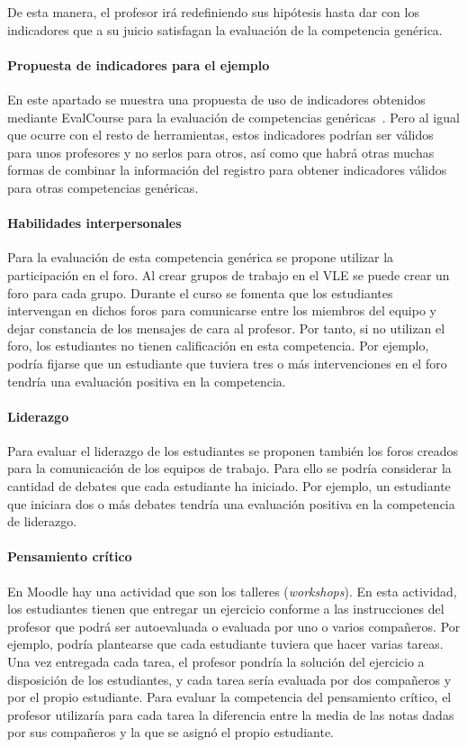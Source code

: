 			De esta manera, el profesor irá redefiniendo sus hipótesis hasta dar con los indicadores que a su juicio satisfagan la evaluación de la competencia genérica.

			\paragraph*{Propuesta de indicadores para el ejemplo}

			En este apartado se muestra una propuesta de uso de indicadores obtenidos mediante EvalCourse para la evaluación de competencias genéricas~\cite{Balderas:2015}. Pero al igual que ocurre con el resto de herramientas, estos indicadores podrían ser válidos para unos profesores y no serlos para otros, así como que habrá otras muchas formas de combinar la información del registro para obtener indicadores válidos para otras competencias genéricas.

				\paragraph*{Habilidades interpersonales}
				Para la evaluación de esta competencia genérica se propone utilizar la participación en el foro. Al crear grupos de trabajo en el VLE se puede crear un foro para cada grupo. Durante el curso se fomenta que los estudiantes intervengan en dichos foros para comunicarse entre los miembros del equipo y dejar constancia de los mensajes de cara al profesor. Por tanto, si no utilizan el foro, los estudiantes no tienen calificación en esta competencia. Por ejemplo, podría fijarse que un estudiante que tuviera tres o más intervenciones en el foro tendría una evaluación positiva en la competencia.

				\paragraph*{Liderazgo}
				Para evaluar el liderazgo de los estudiantes se proponen también los foros creados para la comunicación de los equipos de trabajo. Para ello se podría considerar la cantidad de debates que cada estudiante ha iniciado. Por ejemplo, un estudiante que iniciara dos o más debates tendría una evaluación positiva en la competencia de liderazgo.

				\paragraph*{Pensamiento crítico}
				En Moodle hay una actividad que son los talleres (\emph{workshops}). En esta actividad, los estudiantes tienen que entregar un ejercicio conforme a las instrucciones del profesor que podrá ser autoevaluada o evaluada por uno o varios compañeros. Por ejemplo, podría plantearse que cada estudiante tuviera que hacer varias tareas. Una vez entregada cada tarea, el profesor pondría la solución del ejercicio a disposición de los estudiantes, y cada tarea sería evaluada por dos compañeros y por el propio estudiante. Para evaluar la competencia del pensamiento crítico, el profesor utilizaría para cada tarea la diferencia entre la media de las notas dadas por sus compañeros y la que se asignó el propio estudiante.

